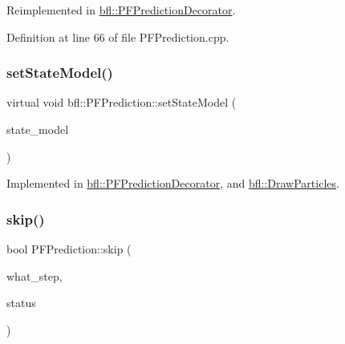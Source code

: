 Reimplemented in \mbox{\hyperlink{classbfl_1_1PFPredictionDecorator_a3c38ae386456ecd0fd1b609b381395ec}{bfl\+::\+P\+F\+Prediction\+Decorator}}.



Definition at line 66 of file P\+F\+Prediction.\+cpp.

\mbox{\label{classbfl_1_1PFPrediction_ac39683650d7f89c59f1426dd7743354e}} 
\subsubsection{\texorpdfstring{set\+State\+Model()}{setStateModel()}}
{\footnotesize\ttfamily virtual void bfl\+::\+P\+F\+Prediction\+::set\+State\+Model (\begin{DoxyParamCaption}\item[{std\+::unique\+\_\+ptr$<$ \mbox{\hyperlink{classbfl_1_1StateModel}{State\+Model}} $>$}]{state\+\_\+model }\end{DoxyParamCaption})\hspace{0.3cm}{\ttfamily [pure virtual]}}



Implemented in \mbox{\hyperlink{classbfl_1_1PFPredictionDecorator_ad269dfbdecf19d67717a8bc44f0bd286}{bfl\+::\+P\+F\+Prediction\+Decorator}}, and \mbox{\hyperlink{classbfl_1_1DrawParticles_acb607ab90c22a43a72a75576acb898a4}{bfl\+::\+Draw\+Particles}}.

\mbox{\label{classbfl_1_1PFPrediction_a364cc35a151e5298c4024d681f3e04d9}} 
\subsubsection{\texorpdfstring{skip()}{skip()}}
{\footnotesize\ttfamily bool P\+F\+Prediction\+::skip (\begin{DoxyParamCaption}\item[{const std\+::string \&}]{what\+\_\+step,  }\item[{const bool}]{status }\end{DoxyParamCaption})}



